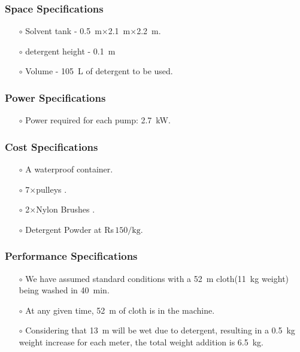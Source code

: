 \subsubsection{Space Specifications}


\begin{itemize}
    \item[$\scriptstyle\circ$] Solvent tank - \SI{0.5}{\meter}$\times$\SI{2.1}{\meter}$\times$\SI{2.2}{\meter}.
    \item[$\scriptstyle\circ$] detergent height - \SI{0.1}{\meter}
    \item[$\scriptstyle\circ$] Volume - \SI{105}{\liter} of detergent to be used.
    
\end{itemize}
\subsubsection{Power Specifications}
\begin{itemize}
    \item[$\scriptstyle\circ$] Power required for each pump: \SI{2.7}{\kilo\watt}.
\end{itemize}
\subsubsection{Cost Specifications}
\begin{itemize}
    \item[$\scriptstyle\circ$] A waterproof container.
    \item[$\scriptstyle\circ$] 7$\times$pulleys .
    \item[$\scriptstyle\circ$] 2$\times$Nylon Brushes .
    \item[$\scriptstyle\circ$] Detergent Powder at Rs\(\,150/\text{kg}\).
    
    
\end{itemize}

\subsubsection{Performance Specifications}

\begin{itemize}
    \item[$\scriptstyle\circ$] We have assumed standard conditions with a \SI{52}{\meter} cloth(\SI{11}{\kilogram} weight) being washed in \SI{40}{\minute}.
     \item[$\scriptstyle\circ$] At any given time, \SI{52}{\meter} of cloth is in the machine. 
     \item[$\scriptstyle\circ$] Considering that \SI{13}{\meter} will be wet due to detergent, resulting in a \SI{0.5}{\kilogram} weight increase for each meter, the total weight addition is \SI{6.5}{\kilogram}. \cite{kane_evaluation_2012} \cite{eduok_effect_2021}


\end{itemize}

